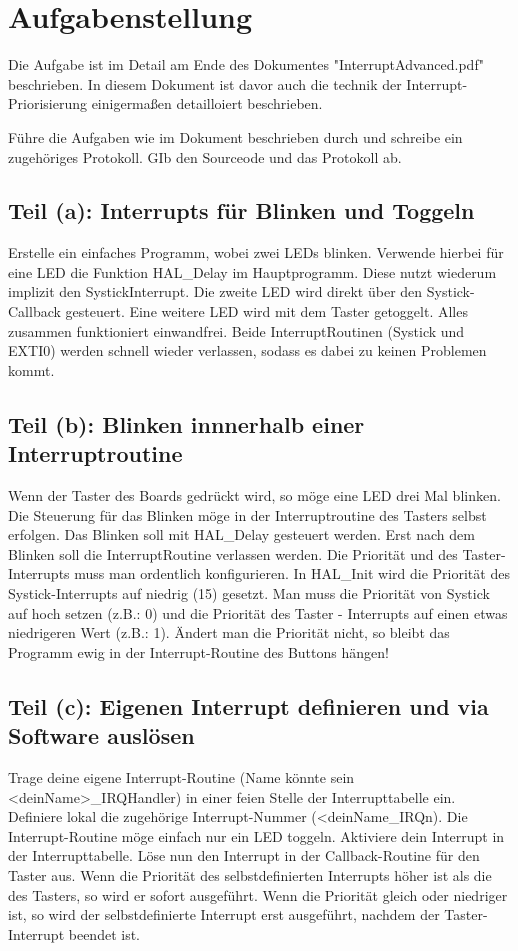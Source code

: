 
\section{Aufgabenstellung}
Die Aufgabe ist im Detail am Ende des Dokumentes "InterruptAdvanced.pdf" beschrieben. In diesem Dokument ist davor auch die technik der Interrupt-Priorisierung einigermaßen detailloiert beschrieben. 

Führe die Aufgaben wie im Dokument beschrieben durch und schreibe ein zugehöriges Protokoll. GIb den Sourceode und das Protokoll ab.
\subsection{Teil (a): Interrupts für Blinken und Toggeln}
Erstelle ein einfaches Programm, wobei zwei LEDs blinken. Verwende hierbei für eine LED
die Funktion HAL\_Delay im Hauptprogramm. Diese nutzt wiederum implizit den SystickInterrupt.
Die zweite LED wird direkt über den Systick-Callback gesteuert. Eine weitere LED
wird mit dem Taster getoggelt. Alles zusammen funktioniert einwandfrei. Beide InterruptRoutinen
(Systick und EXTI0) werden schnell wieder verlassen, sodass es dabei zu keinen
Problemen kommt.
\subsection{Teil (b): Blinken innnerhalb einer Interruptroutine}
Wenn der Taster des Boards gedrückt wird, so möge eine LED drei Mal blinken. Die
Steuerung für das Blinken möge in der Interruptroutine des Tasters selbst erfolgen. Das
Blinken soll mit HAL\_Delay gesteuert werden. Erst nach dem Blinken soll die InterruptRoutine
verlassen werden.
Die Priorität und des Taster-Interrupts muss man ordentlich konfigurieren. In HAL\_Init wird
die Priorität des Systick-Interrupts auf niedrig (15) gesetzt. Man muss die Priorität von
Systick auf hoch setzen (z.B.: 0) und die Priorität des Taster - Interrupts auf einen etwas
niedrigeren Wert (z.B.: 1). Ändert man die Priorität nicht, so bleibt das Programm ewig in der
Interrupt-Routine des Buttons hängen!
\subsection{Teil (c): Eigenen Interrupt definieren und via Software auslösen}
Trage deine eigene Interrupt-Routine (Name könnte sein <deinName>\_IRQHandler) in einer
feien Stelle der Interrupttabelle ein. Definiere lokal die zugehörige Interrupt-Nummer
(<deinName\_IRQn). Die Interrupt-Routine möge einfach nur ein LED toggeln. Aktiviere dein
Interrupt in der Interrupttabelle. Löse nun den Interrupt in der Callback-Routine für den
Taster aus. Wenn die Priorität des selbstdefinierten Interrupts höher ist als die des Tasters,
so wird er sofort ausgeführt. Wenn die Priorität gleich oder niedriger ist, so wird der
selbstdefinierte Interrupt erst ausgeführt, nachdem der Taster-Interrupt beendet ist.
